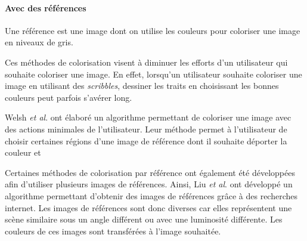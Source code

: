 \documentclass{article}
\begin{document}

\paragraph{Avec des références}
Une référence est une image dont on utilise les couleurs pour coloriser une image en niveaux de gris.

Ces méthodes de colorisation visent à diminuer les efforts d'un utilisateur qui souhaite coloriser une image.
En effet, lorsqu'un utilisateur souhaite coloriser une image en utilisant des \textit{scribbles}, dessiner les traits
en choisissant les bonnes couleurs peut parfois s'avérer long.

Welsh \emph{et al}. \cite{10.1145/566654.566576} ont élaboré un algorithme permettant de coloriser une image avec des actions minimales de l'utilisateur.
Leur méthode permet à l'utilisateur de choisir certaines régions d'une image de référence dont il souhaite déporter la couleur et 

Certaines méthodes de colorisation par référence ont également été développées afin d'utiliser plusieurs images de références.
Ainsi, Liu \emph{et al}. \cite{10.1145/1409060.1409105} ont développé un algorithme permettant d'obtenir des images de références grâce à des 
recherches internet. Les images de références sont donc diverses car elles représentent une scène similaire sous un angle différent ou avec une 
luminosité différente. Les couleurs de ces images sont transférées à l'image souhaitée.
\end{document}
